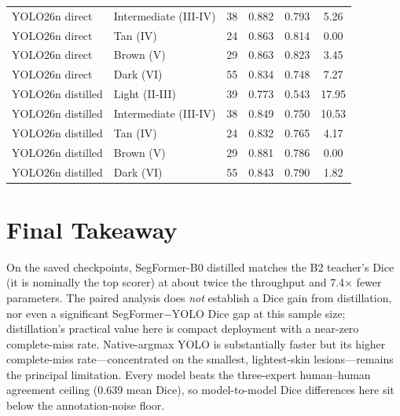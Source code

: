 \documentclass[11pt]{article}
\begin{document}
\begin{center}
\begin{tabular}{l l c c c c}
YOLO26n direct & Intermediate (III-IV)  & 38 & 0.882 & 0.793 & 5.26 \\
YOLO26n direct & Tan (IV)               & 24 & 0.863 & 0.814 & 0.00 \\
YOLO26n direct & Brown (V)              & 29 & 0.863 & 0.823 & 3.45 \\
YOLO26n direct & Dark (VI)              & 55 & 0.834 & 0.748 & 7.27 \\
\midrule
YOLO26n distilled & Light (II-III)        & 39 & 0.773 & 0.543 & 17.95 \\
YOLO26n distilled & Intermediate (III-IV) & 38 & 0.849 & 0.750 & 10.53 \\
YOLO26n distilled & Tan (IV)              & 24 & 0.832 & 0.765 & 4.17 \\
YOLO26n distilled & Brown (V)             & 29 & 0.881 & 0.786 & 0.00 \\
YOLO26n distilled & Dark (VI)             & 55 & 0.843 & 0.790 & 1.82 \\
\bottomrule
\end{tabular}
\end{center}

\section{Final Takeaway}

On the saved checkpoints, SegFormer-B0 distilled matches the B2 teacher's Dice (it is
nominally the top scorer) at about twice the throughput and 7.4$\times$ fewer parameters.
The paired analysis does \emph{not} establish a Dice gain from distillation, nor even a
significant SegFormer$-$YOLO Dice gap at this sample size; distillation's practical value
here is compact deployment with a near-zero complete-miss rate. Native-argmax YOLO is
substantially faster but its higher complete-miss rate---concentrated on the smallest,
lightest-skin lesions---remains the principal limitation. Every model beats the
three-expert human--human agreement ceiling (0.639 mean Dice), so model-to-model Dice
differences here sit below the annotation-noise floor.
\end{document}

